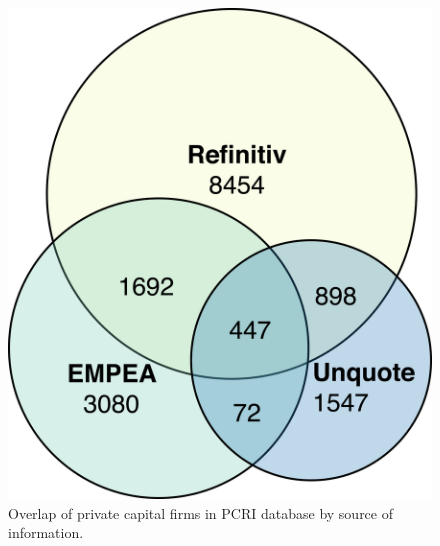 
\begin{figure}
    \centering
\includegraphics[width=\widthpcria]{./figures/pcrifigure1.png}
\caption{Overlap of private capital firms in PCRI database by source of information.\label{fig:pcrifigure1}}
\end{figure}
